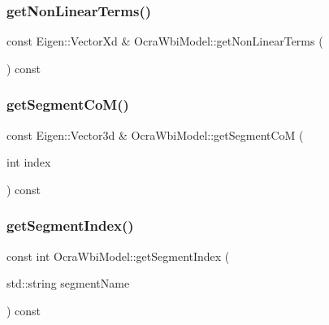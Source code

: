 \hypertarget{classocra__icub_1_1OcraWbiModel_a5802b0c6f4a8221e681fa41558f1b57c}{}\label{classocra__icub_1_1OcraWbiModel_a5802b0c6f4a8221e681fa41558f1b57c} 
\subsubsection{\texorpdfstring{get\+Non\+Linear\+Terms()}{getNonLinearTerms()}}
{\footnotesize\ttfamily const Eigen\+::\+Vector\+Xd \& Ocra\+Wbi\+Model\+::get\+Non\+Linear\+Terms (\begin{DoxyParamCaption}{ }\end{DoxyParamCaption}) const\hspace{0.3cm}{\ttfamily [virtual]}}

\hypertarget{classocra__icub_1_1OcraWbiModel_a40e740aac3a79f6e607768b5bae9affb}{}\label{classocra__icub_1_1OcraWbiModel_a40e740aac3a79f6e607768b5bae9affb} 
\subsubsection{\texorpdfstring{get\+Segment\+Co\+M()}{getSegmentCoM()}}
{\footnotesize\ttfamily const Eigen\+::\+Vector3d \& Ocra\+Wbi\+Model\+::get\+Segment\+CoM (\begin{DoxyParamCaption}\item[{int}]{index }\end{DoxyParamCaption}) const\hspace{0.3cm}{\ttfamily [virtual]}}

\hypertarget{classocra__icub_1_1OcraWbiModel_a9750492360a40e1b182ab05d19526ba2}{}\label{classocra__icub_1_1OcraWbiModel_a9750492360a40e1b182ab05d19526ba2} 
\subsubsection{\texorpdfstring{get\+Segment\+Index()}{getSegmentIndex()}}
{\footnotesize\ttfamily const int Ocra\+Wbi\+Model\+::get\+Segment\+Index (\begin{DoxyParamCaption}\item[{std\+::string}]{segment\+Name }\end{DoxyParamCaption}) const\hspace{0.3cm}{\ttfamily [virtual]}}

